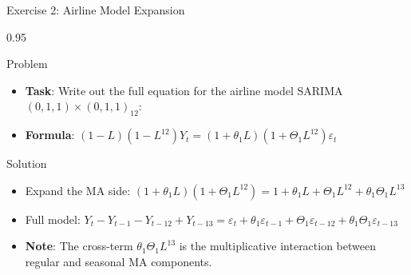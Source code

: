 \documentclass[9pt, aspectratio=169, t]{beamer}
\begin{document}
\begin{frame}{Exercise 2: Airline Model Expansion}
    \begin{cminipage}{0.95\textwidth}
    \begin{alertblock}{Problem}
        \begin{itemize}\setlength{\itemsep}{0pt}
            \item \textbf{Task}: Write out the full equation for the airline model SARIMA$(0,1,1) \times (0,1,1)_{12}$:
            \item \textbf{Formula}: $(1-L)(1-L^{12})Y_t = (1+\theta_1 L)(1+\Theta_1 L^{12})\varepsilon_t$
        \end{itemize}
    \end{alertblock}

    \vspace{0.2cm}
    \begin{exampleblock}{Solution}
        \begin{itemize}\setlength{\itemsep}{0pt}
            \item Expand the MA side: $(1+\theta_1 L)(1+\Theta_1 L^{12}) = 1 + \theta_1 L + \Theta_1 L^{12} + \theta_1 \Theta_1 L^{13}$
            \item Full model: $Y_t - Y_{t-1} - Y_{t-12} + Y_{t-13} = \varepsilon_t + \theta_1 \varepsilon_{t-1} + \Theta_1 \varepsilon_{t-12} + \theta_1 \Theta_1 \varepsilon_{t-13}$
            \item \textbf{Note}: The cross-term $\theta_1 \Theta_1 L^{13}$ is the multiplicative interaction between regular and seasonal MA components.
        \end{itemize}
    \end{exampleblock}
    \end{cminipage}
\end{frame}
\end{document}
